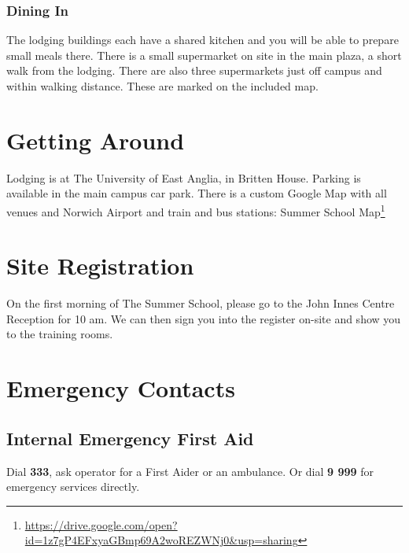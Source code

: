 \documentclass[12pt,]{book}
\let\rmarkdownfootnote\footnote%
\def\footnote{\protect\rmarkdownfootnote}
\renewcommand{\href}[2]{#2\footnote{\url{#1}}}
\theoremstyle{definition}
\theoremstyle{definition}
\theoremstyle{remark}
\begin{document}
\subsubsection*{Dining In}\label{dining-in}

The lodging buildings each have a shared kitchen and you will be able to
prepare small meals there. There is a small supermarket on site in the
main plaza, a short walk from the lodging. There are also three
supermarkets just off campus and within walking distance. These are
marked on the included map.

\section*{Getting Around}\label{getting-around}

Lodging is at The University of East Anglia, in Britten House. Parking
is available in the main campus car park. There is a custom Google Map
with all venues and Norwich Airport and train and bus stations:
\href{https://drive.google.com/open?id=1z7gP4EFxyaGBmp69A2woREZWNj0\&usp=sharing}{Summer
School Map}

\section*{Site Registration}\label{site-registration}

On the first morning of The Summer School, please go to the John Innes
Centre Reception for 10 am. We can then sign you into the register
on-site and show you to the training rooms.

\section*{Emergency Contacts}\label{emergency-contacts}

\subsection*{Internal Emergency First
Aid}\label{internal-emergency-first-aid}

Dial \textbf{333}, ask operator for a First Aider or an ambulance. Or
dial \textbf{9 999} for emergency services directly.
\end{document}

